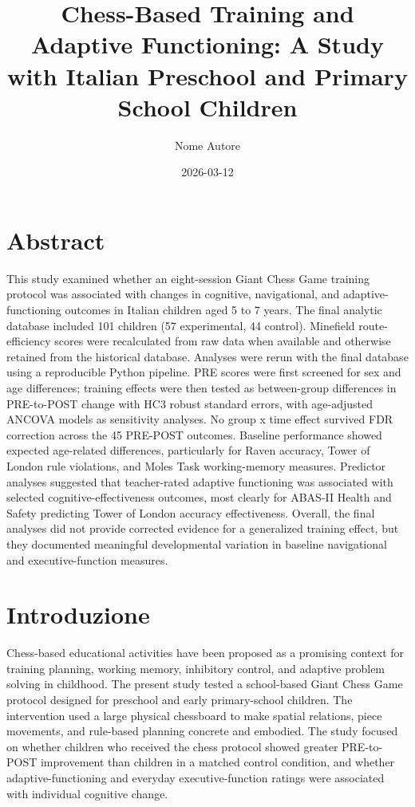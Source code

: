 \documentclass[
  letterpaper,
  DIV=11,
  numbers=noendperiod]{scrartcl}
\title{Chess-Based Training and Adaptive Functioning: A Study with
Italian Preschool and Primary School Children}
\author{Nome Autore}
\date{2026-03-12}
\begin{document}
\maketitle


\section{Abstract}\label{abstract}

This study examined whether an eight-session Giant Chess Game training
protocol was associated with changes in cognitive, navigational, and
adaptive-functioning outcomes in Italian children aged 5 to 7 years. The
final analytic database included 101 children (57 experimental, 44
control). Minefield route-efficiency scores were recalculated from raw
data when available and otherwise retained from the historical database.
Analyses were rerun with the final database using a reproducible Python
pipeline. PRE scores were first screened for sex and age differences;
training effects were then tested as between-group differences in
PRE-to-POST change with HC3 robust standard errors, with age-adjusted
ANCOVA models as sensitivity analyses. No group x time effect survived
FDR correction across the 45 PRE-POST outcomes. Baseline performance
showed expected age-related differences, particularly for Raven
accuracy, Tower of London rule violations, and Moles Task working-memory
measures. Predictor analyses suggested that teacher-rated adaptive
functioning was associated with selected cognitive-effectiveness
outcomes, most clearly for ABAS-II Health and Safety predicting Tower of
London accuracy effectiveness. Overall, the final analyses did not
provide corrected evidence for a generalized training effect, but they
documented meaningful developmental variation in baseline navigational
and executive-function measures.

\section{Introduzione}\label{introduzione}

Chess-based educational activities have been proposed as a promising
context for training planning, working memory, inhibitory control, and
adaptive problem solving in childhood. The present study tested a
school-based Giant Chess Game protocol designed for preschool and early
primary-school children. The intervention used a large physical
chessboard to make spatial relations, piece movements, and rule-based
planning concrete and embodied. The study focused on whether children
who received the chess protocol showed greater PRE-to-POST improvement
than children in a matched control condition, and whether
adaptive-functioning and everyday executive-function ratings were
associated with individual cognitive change.
\end{document}
